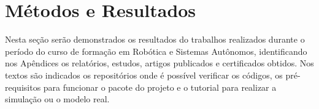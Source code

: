 \chapter{Métodos e Resultados}
\label{chap:result}
Nesta seção serão demonstrados os resultados do trabalhos realizados durante o período do curso de formação em Robótica e Sistemas Autônomos, identificando nos Apêndices os relatórios, estudos, artigos publicados e certificados obtidos. 
Nos textos são indicados os repositórios onde é possível verificar os códigos, os pré-requisitos para funcionar o pacote do projeto e o tutorial para realizar a simulação ou o modelo real.



